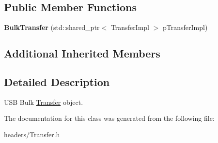 \subsection*{Public Member Functions}
\begin{DoxyCompactItemize}
\item 
\hypertarget{class_lib_u_s_b_1_1_bulk_transfer_ac9e1f20fa379b49a0b7494bf2509d11f}{{\bfseries Bulk\-Transfer} (std\-::shared\-\_\-ptr$<$ Transfer\-Impl $>$ p\-Transfer\-Impl)}\label{class_lib_u_s_b_1_1_bulk_transfer_ac9e1f20fa379b49a0b7494bf2509d11f}

\end{DoxyCompactItemize}
\subsection*{Additional Inherited Members}


\subsection{Detailed Description}
U\-S\-B Bulk \hyperlink{class_lib_u_s_b_1_1_transfer}{Transfer} object. 

The documentation for this class was generated from the following file\-:\begin{DoxyCompactItemize}
\item 
headers/Transfer.\-h\end{DoxyCompactItemize}
